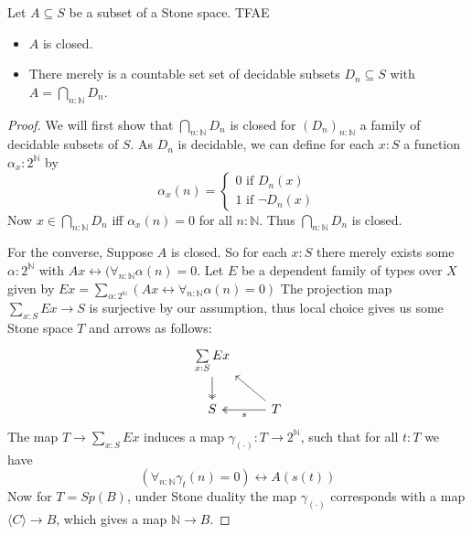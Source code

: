 \begin{lemma}
  Let $A\subseteq S$ be a subset of a Stone space. TFAE
  \begin{itemize}
    \item $A$ is closed. 
    \item There merely is a countable set set of decidable subsets $D_n\subseteq S$ with 
      $A = \bigcap_{n:\mathbb N} D_n$. 
  \end{itemize}
\end{lemma}
\begin{proof}
  We will first show that $\bigcap_{n:\mathbb N} D_n$ is closed for $(D_n)_{n:\mathbb N}$ 
  a family of decidable subsets of $S$. 
  As $D_n$ is decidable, we can define for each $x:S$ a function 
  $\alpha_x:2^\mathbb N$ by 
  \begin{equation}
    \alpha_x(n) = 
    \begin{cases} 
      0 \text { if } D_n(x)\\
      1 \text { if } \neg D_n(x)
    \end{cases}
  \end{equation} 
  Now $x\in \bigcap_{n:\mathbb N} D_n $ iff $\alpha_x(n) = 0$ for all $n:\mathbb N$. 
  Thus $\bigcap_{n:\mathbb N} D_n$ is closed. 
  \medskip

  For the converse, 
  Suppose $A$ is closed. So for each $x: S$ there merely exists some 
  $\alpha:2^\mathbb N$ with $A x \leftrightarrow (\forall_{n:\mathbb N}\alpha(n) = 0$. 
  Let $E$ be a dependent family of types over $X$ given by
  $E x  = \sum\limits_{\alpha:2^\mathbb N} 
  (A x \leftrightarrow \forall_{n:\mathbb N} \alpha(n) = 0)$
  The projection map $\sum\limits_{x: S} E x \to S$ is surjective by our assumption, 
  thus local choice gives us some Stone space $T$ and arrows as follows:
  \begin{equation}\begin{tikzcd}
    \sum\limits_{x:S}E x \arrow[d,""',two heads]\\
    S & \arrow[l, "", two heads,"s"] T\arrow[lu, ""']
  \end{tikzcd}\end{equation}  
  The map $T\to \sum\limits_{x:S} E x $ induces a map $\gamma_{(\cdot)}:T \to 2^\mathbb N$, 
  such that for all $t:T$ we have 
  \begin{equation}
    (\forall_{n:\mathbb N} \gamma_t(n)  = 0 )\leftrightarrow A ( s (t))
  \end{equation}
  Now for $T = Sp(B)$, under Stone duality the map $\gamma_{(\cdot )}$ 
  corresponds with a map $\langle C \rangle \to B$, 
  which gives a map $\mathbb N \to B$. 



\end{proof}




